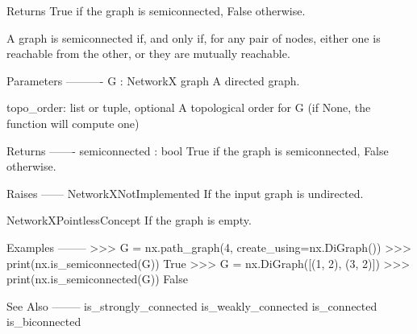 \begin{DoxyVerb}Returns True if the graph is semiconnected, False otherwise.

A graph is semiconnected if, and only if, for any pair of nodes, either one
is reachable from the other, or they are mutually reachable.

Parameters
----------
G : NetworkX graph
    A directed graph.

topo_order: list or tuple, optional
    A topological order for G (if None, the function will compute one)

Returns
-------
semiconnected : bool
    True if the graph is semiconnected, False otherwise.

Raises
------
NetworkXNotImplemented
    If the input graph is undirected.

NetworkXPointlessConcept
    If the graph is empty.

Examples
--------
>>> G = nx.path_graph(4, create_using=nx.DiGraph())
>>> print(nx.is_semiconnected(G))
True
>>> G = nx.DiGraph([(1, 2), (3, 2)])
>>> print(nx.is_semiconnected(G))
False

See Also
--------
is_strongly_connected
is_weakly_connected
is_connected
is_biconnected
\end{DoxyVerb}
 